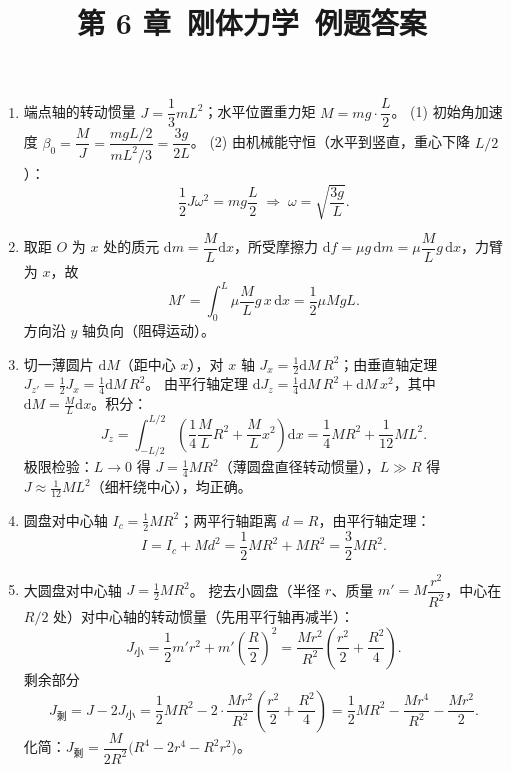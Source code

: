 \documentclass[12pt]{article}
\title{第 6 章\ 刚体力学\ 例题答案}
\author{}
\date{}
\begin{document}
\maketitle

\begin{enumerate}[label=\textbf{例\arabic*.}, leftmargin=*]

\item 端点轴的转动惯量 $J = \dfrac{1}{3}mL^2$；水平位置重力矩 $M = mg\cdot\dfrac{L}{2}$。
(1) 初始角加速度 $\beta_0 = \dfrac{M}{J} = \dfrac{mgL/2}{mL^2/3} = \dfrac{3g}{2L}$。
(2) 由机械能守恒（水平到竖直，重心下降 $L/2$）：
\[
  \frac{1}{2}J\omega^2 = mg\frac{L}{2} \;\Rightarrow\; \omega = \sqrt{\frac{3g}{L}}.
\]

\item 取距 $O$ 为 $x$ 处的质元 $\mathrm{d}m = \dfrac{M}{L}\mathrm{d}x$，所受摩擦力 $\mathrm{d}f = \mu g\,\mathrm{d}m = \mu\dfrac{M}{L}g\,\mathrm{d}x$，力臂为 $x$，故
\[
  M' = \int_0^L \mu\frac{M}{L}g\,x\,\mathrm{d}x = \frac{1}{2}\mu MgL.
\]
方向沿 $y$ 轴负向（阻碍运动）。

\item 切一薄圆片 $\mathrm{d}M$（距中心 $x$），对 $x$ 轴 $J_x=\tfrac{1}{2}\mathrm{d}M\,R^2$；由垂直轴定理 $J_{z'}=\tfrac{1}{2}J_x=\tfrac{1}{4}\mathrm{d}M\,R^2$。
由平行轴定理 $\mathrm{d}J_z = \tfrac{1}{4}\mathrm{d}M\,R^2 + \mathrm{d}M\,x^2$，其中 $\mathrm{d}M=\tfrac{M}{L}\mathrm{d}x$。积分：
\[
  J_z = \int_{-L/2}^{L/2}\!\left(\frac{1}{4}\frac{M}{L}R^2 + \frac{M}{L}x^2\right)\mathrm{d}x = \frac{1}{4}MR^2 + \frac{1}{12}ML^2.
\]
极限检验：$L\!\to\!0$ 得 $J=\tfrac{1}{4}MR^2$（薄圆盘直径转动惯量），$L\gg R$ 得 $J\approx\tfrac{1}{12}ML^2$（细杆绕中心），均正确。

\item 圆盘对中心轴 $I_c = \tfrac{1}{2}MR^2$；两平行轴距离 $d=R$，由平行轴定理：
\[
  I = I_c + Md^2 = \frac{1}{2}MR^2 + MR^2 = \frac{3}{2}MR^2.
\]

\item 大圆盘对中心轴 $J = \tfrac{1}{2}MR^2$。
挖去小圆盘（半径 $r$、质量 $m' = M\dfrac{r^2}{R^2}$，中心在 $R/2$ 处）对中心轴的转动惯量（先用平行轴再减半）：
\[
  J_\text{小} = \frac{1}{2}m' r^2 + m'\!\left(\frac{R}{2}\right)^2 = \frac{Mr^2}{R^2}\!\left(\frac{r^2}{2}+\frac{R^2}{4}\right).
\]
剩余部分
\[
  J_\text{剩} = J - 2J_\text{小} = \frac{1}{2}MR^2 - 2\cdot\frac{Mr^2}{R^2}\!\left(\frac{r^2}{2}+\frac{R^2}{4}\right)
  = \frac{1}{2}MR^2 - \frac{Mr^4}{R^2} - \frac{Mr^2}{2}.
\]
化简：$J_\text{剩} = \dfrac{M}{2R^2}\bigl(R^4 - 2r^4 - R^2r^2\bigr)$。


\end{enumerate}
\end{document}

